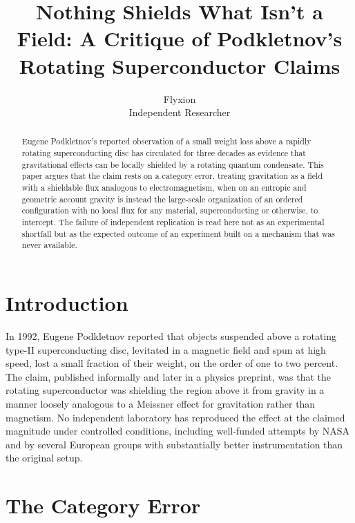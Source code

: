 \documentclass[11pt]{article}
\title{Nothing Shields What Isn't a Field: A Critique of Podkletnov's Rotating Superconductor Claims}
\author{Flyxion \\ \small Independent Researcher}
\date{}
\begin{document}
\maketitle

\begin{abstract}
Eugene Podkletnov's reported observation of a small weight loss above a rapidly rotating superconducting disc has circulated for three decades as evidence that gravitational effects can be locally shielded by a rotating quantum condensate. This paper argues that the claim rests on a category error, treating gravitation as a field with a shieldable flux analogous to electromagnetism, when on an entropic and geometric account gravity is instead the large-scale organization of an ordered configuration with no local flux for any material, superconducting or otherwise, to intercept. The failure of independent replication is read here not as an experimental shortfall but as the expected outcome of an experiment built on a mechanism that was never available.
\end{abstract}

\section{Introduction}

In 1992, Eugene Podkletnov reported that objects suspended above a rotating type-II superconducting disc, levitated in a magnetic field and spun at high speed, lost a small fraction of their weight, on the order of one to two percent. The claim, published informally and later in a physics preprint, was that the rotating superconductor was shielding the region above it from gravity in a manner loosely analogous to a Meissner effect for gravitation rather than magnetism. No independent laboratory has reproduced the effect at the claimed magnitude under controlled conditions, including well-funded attempts by NASA and by several European groups with substantially better instrumentation than the original setup.

\section{The Category Error}
\end{document}
